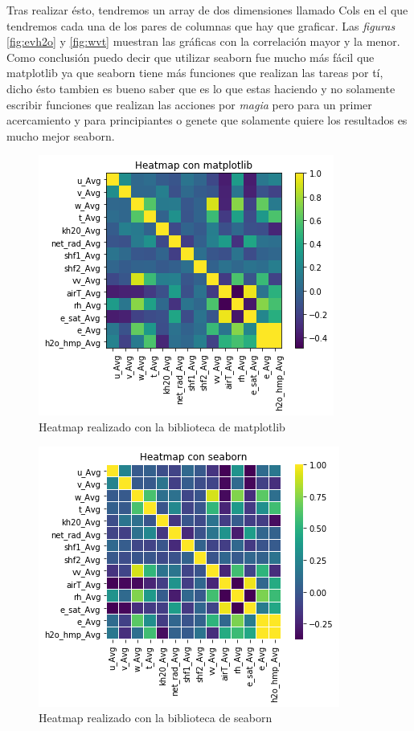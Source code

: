 \documentclass[12pt]{article}
\begin{document}
Tras realizar \'esto, tendremos un array de dos dimensiones llamado Cols en el que tendremos cada una de los pares de columnas que hay que graficar. Las \textit{figuras} \ref{fig:evh2o} y \ref{fig:wvt} muestran las gr\'aficas con la correlaci\'on mayor y la menor.\\

Como conclusi\'on puedo decir que utilizar seaborn fue mucho m\'as f\'acil que matplotlib ya que seaborn tiene m\'as funciones que realizan las tareas por t\'i, dicho \'esto tambien es bueno saber que es lo que estas haciendo y no solamente escribir funciones que realizan las acciones por \textit{magia} pero para un primer acercamiento y para principiantes o genete que solamente quiere los resultados es mucho mejor seaborn.
\begin{figure}
    \centering
    \includegraphics[scale = .7]{matplot.png}
    \caption{Heatmap realizado con la biblioteca de matplotlib}
    \label{fig:matplot}
\end{figure}
\begin{figure}
    \centering
    \includegraphics[scale = .7]{seaborn.png}
    \caption{Heatmap realizado con la biblioteca de seaborn}
    \label{fig:seaborn}
\end{figure}
\end{document}
